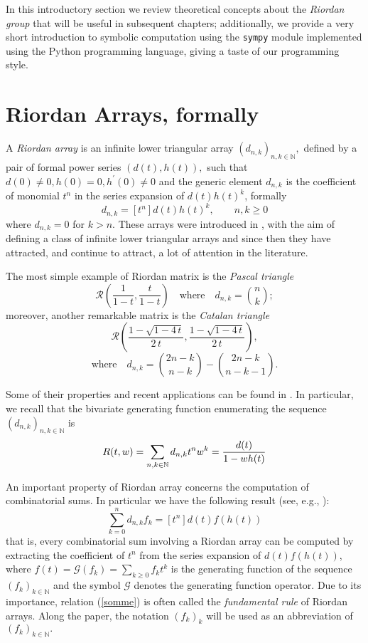 
In this introductory section we review theoretical concepts about the
\textit{Riordan group} that will be useful in subsequent chapters;
additionally, we provide a very short introduction to symbolic computation
using the \verb|sympy| module implemented using the Python programming
language, giving a taste of our programming style.


\section{Riordan Arrays, formally}

A \textit{Riordan array} is an infinite lower triangular array
$(d_{n,k} )_{n,k \in \mathbb{N}},$ defined by a pair of formal power series
$(d(t),h(t)),$ such that $d(0)\neq 0, h(0)=0, h^\prime(0)\neq0$ and the generic
element $d_{n,k}$ is the coefficient of monomial $t^{n}$ in the series
expansion of $d(t)h(t)^{k}$, formally
\begin{displaymath}
    d_{n,k}=[t^n]d(t)h(t)^k, \qquad n,k \geq 0
\end{displaymath}
where $d_{n,k}=0$ for $k>n.$ These arrays were introduced in
\citep{SHAPIRO1991229}, with the aim of defining a class of infinite lower
triangular arrays and since then they have attracted, and continue to attract,
a lot of attention in the literature.

The most simple example of Riordan matrix is the \textit{Pascal triangle}
$$\mathcal{R}\left(\frac{1}{1-t}, \frac{t}{1-t}\right)\quad\text{where}\quad
d_{n,k}={n\choose k};$$ moreover, another remarkable matrix is the
\textit{Catalan triangle}
$$\mathcal{R}\left(\frac{1-\sqrt{1-4\,t}}{2\,t}, \frac{1-\sqrt{1-4\,t}}{2\,t}\right),$$
$$\text{where}\quad d_{n,k}={{2n-k}\choose{n-k}} - {{2n-k}\choose{n-k-1}}.$$

Some of their properties  and recent applications can be found
in \citep{LUZON201475,MRSV97}. In particular, we recall that the bivariate generating
function enumerating the sequence $(d_{n,k} )_{n,k \in\mathbb{N}}$ is
\begin{equation}
    \label{bgf}
    R(t,w) = \sum_{n,k \in\mathbb{N}}{d_{n,k} t^n w^k} = {d(t) \over 1-wh(t)}
\end{equation}

An important property of Riordan array concerns the computation of
combinatorial sums.  In particular we have the following result (see, e.g.,
\citep{LUZON2012631,Merlini:2009:CSI:2653507.2654195,SPRUGNOLI1994267}):
\begin{equation}
    \label{somme}
    \sum_{k=0}^n d_{n,k}f_k=[t^n]d(t)f(h(t))
\end{equation}
that is, every combinatorial sum involving a Riordan array can be computed by
extracting the coefficient of $t^n$ from the series expansion of $d(t)f(h(t))$,
where $f(t)=\mathcal{G}(f_k)=\sum_{k\geq 0}f_kt^k$ is the generating function of the
sequence $(f_k)_{k \in\mathbb{N}}$ and the symbol $\mathcal{G}$ denotes the generating function
operator. Due to its importance, relation (\ref{somme}) is often called the
\textit{fundamental rule} of Riordan arrays.  Along the paper, the notation
$(f_k)_{k}$ will be used as an abbreviation of $(f_k)_{k\in\mathbb{N}}.$

